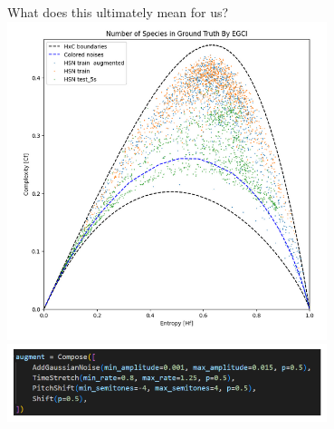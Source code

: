 \begin{frame}{What does this ultimately mean for us?}   
    \centering
    \includegraphics[height=0.7\textheight,width=0.7\textwidth,keepaspectratio]{images/dataAugExample.png}  
    \includegraphics[height=0.7\textheight,width=0.7\textwidth,keepaspectratio]{images/augmentation.png}  
\end{frame}



























